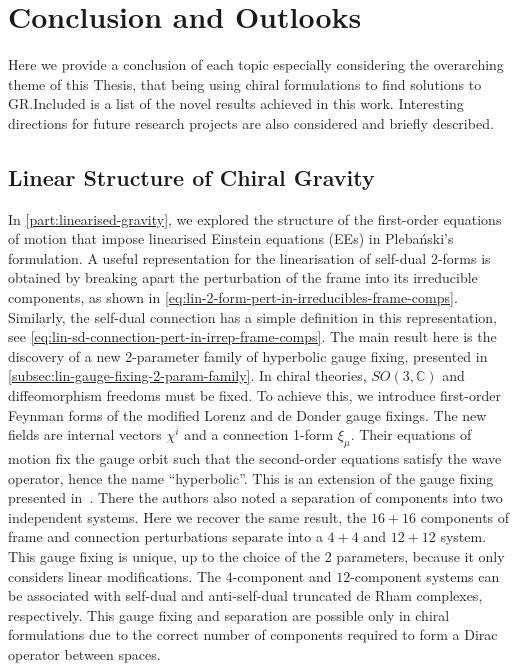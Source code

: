 \documentclass[10pt]{report}
\newcommand{\pleb}[0]{Pleba\'nski}
\theoremstyle{definition}
\begin{document}
    \newpage
\chapter{Conclusion and Outlooks}
    Here we provide a conclusion of each topic especially considering the overarching theme of this Thesis, that being using chiral formulations to find solutions to GR.\@ Included is a list of the novel results achieved in this work. Interesting directions for future research projects are also considered and briefly described.

    \section{Linear Structure of Chiral Gravity}
    In \cref{part:linearised-gravity}, we explored the structure of the first-order equations of motion that impose linearised Einstein equations (EEs) in \pleb{}'s formulation. A useful representation for the linearisation of self-dual 2-forms is obtained by breaking apart the perturbation of the frame into its irreducible components, as shown in \cref{eq:lin-2-form-pert-in-irreducibles-frame-comps}. Similarly, the self-dual connection has a simple definition in this representation, see \cref{eq:lin-sd-connection-pert-in-irrep-frame-comps}. The main result here is the discovery of a new 2-parameter family of hyperbolic gauge fixing, presented in \cref{subsec:lin-gauge-fixing-2-param-family}. In chiral theories, $SO(3,\mathbb{C})$ and diffeomorphism freedoms must be fixed. To achieve this, we introduce first-order Feynman forms of the modified Lorenz and de Donder gauge fixings. The new fields are internal vectors $\chi^i$ and a connection 1-form $\xi_\mu$. Their equations of motion fix the gauge orbit such that the second-order equations satisfy the wave operator, hence the name ``hyperbolic''. This is an extension of the gauge fixing presented in~\cite{ChiralPerturbaKrasno2020}. There the authors also noted a separation of components into two independent systems. Here we recover the same result, the $16+16$ components of frame and connection perturbations separate into a $4+4$ and $12+12$ system. This gauge fixing is unique, up to the choice of the 2 parameters, because it only considers linear modifications. The $4$-component and $12$-component systems can be associated with self-dual and anti-self-dual truncated de Rham complexes, respectively. This gauge fixing and separation are possible only in chiral formulations due to the correct number of components required to form a Dirac operator between spaces.
\end{document}
